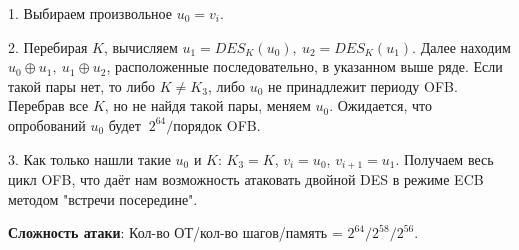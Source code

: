 1. Выбираем произвольное $u_0 = v_i$.

2. Перебирая $K$, вычисляем $u_1 = DES_{K}(u_0),\ u_2 = DES_{K}(u_1)$. Далее находим $u_0 \oplus u_1,\ u_1 \oplus u_2$, расположенные последовательно, в указанном выше ряде. Если такой пары нет, то либо $K \ne K_3$, либо $u_0$ не принадлежит периоду OFB. Перебрав все $K$, но не найдя такой пары, меняем $u_0$. Ожидается, что опробований $u_0$ будет $~2^{64}/$порядок OFB.

3. Как только нашли такие $u_0$ и $K$: $K_3 = K$, $v_i = u_0$, $v_{i+1} = u_1$. Получаем весь цикл OFB, что даёт нам возможность атаковать двойной DES в режиме ECB методом "встречи посередине".

\textbf{Сложность атаки}: Кол-во ОТ/кол-во шагов/память = $2^{64}/2^{58}/2^{56}$.